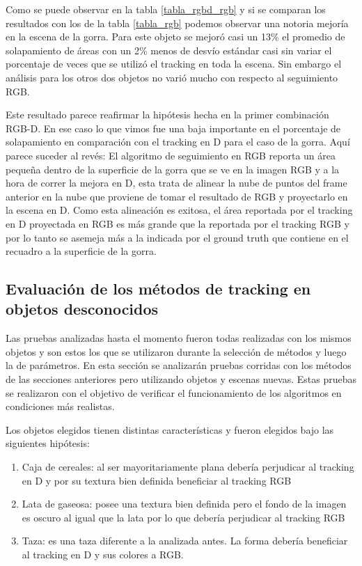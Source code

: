 Como se puede observar en la tabla \ref{tabla_rgbd_rgb} y si se comparan los resultados con los de la tabla \ref{tabla_rgb} podemos observar una notoria mejoría en la escena de la gorra. Para este objeto se mejoró casi un 13\% el promedio de solapamiento de áreas con un 2\% menos de desvío estándar casi sin variar el porcentaje de veces que se utilizó el tracking en toda la escena. Sin embargo el análisis para los otros dos objetos no varió mucho con respecto al seguimiento RGB.

Este resultado parece reafirmar la hipótesis hecha en la primer combinación RGB-D. En ese caso lo que vimos fue una baja importante en el porcentaje de solapamiento en comparación con el tracking en D para el caso de la gorra. Aquí parece suceder al revés: El algoritmo de seguimiento en RGB reporta un área pequeña dentro de la superficie de la gorra que se ve en la imagen RGB y a la hora de correr la mejora en D, esta trata de alinear la nube de puntos del frame anterior en la nube que proviene de tomar el resultado de RGB y proyectarlo en la escena en D. Como esta alineación es exitosa, el área reportada por el tracking en D proyectada en RGB es más grande que la reportada por el tracking RGB y por lo tanto se asemeja más a la indicada por el ground truth que contiene en el recuadro a la superficie de la gorra.




\subsection{Evaluación de los métodos de tracking en objetos desconocidos}

Las pruebas analizadas hasta el momento fueron todas realizadas con los mismos objetos y son estos los que se utilizaron durante la selección de métodos y luego la de parámetros. En esta sección se analizarán pruebas corridas con los métodos de las secciones anteriores pero utilizando objetos y escenas nuevas. Estas pruebas se realizaron con el objetivo de verificar el funcionamiento de los algoritmos en condiciones más realistas.

Los objetos elegidos tienen distintas características y fueron elegidos bajo las siguientes hipótesis:
\begin{enumerate}
	\item Caja de cereales: al ser mayoritariamente plana debería perjudicar al tracking en D y por su textura bien definida beneficiar al tracking RGB
	\item Lata de gaseosa: posee una textura bien definida pero el fondo de la imagen es oscuro al igual que la lata por lo que debería perjudicar al tracking RGB
	\item Taza: es una taza diferente a la analizada antes. La forma debería beneficiar al tracking en D y sus colores a RGB.
\end{enumerate}


